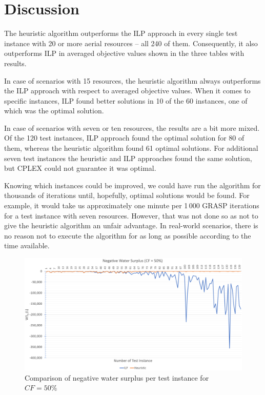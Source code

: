 \section{Discussion}\label{sec:discussion}

The heuristic algorithm outperforms the ILP approach in every single test instance with 20 or more aerial resources -- all 240 of them.
Consequently, it also outperforms ILP in averaged objective values shown in the three tables with results.

In case of scenarios with 15 resources, the heuristic algorithm always outperforms the ILP approach with respect to averaged objective values.
When it comes to specific instances, ILP found better solutions in 10 of the 60 instances, one of which was the optimal solution.

In case of scenarios with seven or ten resources, the results are a bit more mixed.
Of the 120 test instances, ILP approach found the optimal solution for 80 of them, whereas the heuristic algorithm found 61 optimal solutions.
For additional seven test instances the heuristic and ILP approaches found the same solution, but CPLEX could not guarantee it was optimal.

Knowing which instances could be improved, we could have run the algorithm for thousands of iterations until, hopefully, optimal solutions would be found.
For example, it would take us approximately one minute per 1\,000 GRASP iterations for a test instance with seven resources.
However, that was not done so as not to give the heuristic algorithm an unfair advantage.
In real-world scenarios, there is no reason not to execute the algorithm for as long as possible according to the time available.

\begin{figure}[htb]
    \centering
    \includegraphics[width=\linewidth]{img/wsn-cf50.png}
    \caption{Comparison of negative water surplus per test instance for $\mathit{CF} = 50\%$}
    \label{fig:wsn-cf50}
\end{figure}

